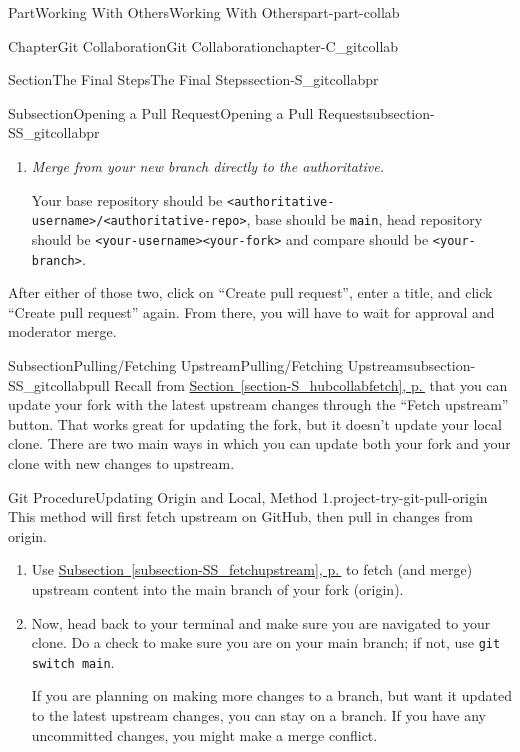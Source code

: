 \documentclass[twoside,10pt,]{book}
\newcommand{\xreffont}{\relax}
\newcommand{\mono}[1]{\texttt{#1}}
\newcommand{\lititle}[1]{{\slshape#1}}
\begin{document}
\begin{partptx}{Part}{Working With Others}{}{Working With Others}{}{}{part-part-collab}
\begin{chapterptx}{Chapter}{Git Collaboration}{}{Git Collaboration}{}{}{chapter-C_gitcollab}
\begin{sectionptx}{Section}{The Final Steps}{}{The Final Steps}{}{}{section-S_gitcollabpr}
\begin{subsectionptx}{Subsection}{Opening a Pull Request}{}{Opening a Pull Request}{}{}{subsection-SS_gitcollabpr}
\begin{enumerate}
\item{}\lititle{Merge from your new branch directly to the authoritative.}\par%
Your base repository should be \mono{<authoritative-username>/<authoritative-repo>}, base should be \mono{main}, head repository should be \mono{<your-username><your-fork>} and compare should be \mono{<your-branch>}.%
\end{enumerate}
%
\par
After either of those two, click on ``Create pull request'', enter a title, and click ``Create pull request'' again. From there, you will have to wait for approval and moderator merge.%
\end{subsectionptx}
%
%
\typeout{************************************************}
\typeout{************************************************}
%
\begin{subsectionptx}{Subsection}{Pulling\slash{}Fetching Upstream}{}{Pulling\slash{}Fetching Upstream}{}{}{subsection-SS_gitcollabpull}
%
%
%
%
%
Recall from \hyperref[section-S_hubcollabfetch]{Section~{\xreffont\ref{section-S_hubcollabfetch}}, p.\,\pageref{section-S_hubcollabfetch}} that you can update your fork with the latest upstream changes through the ``Fetch upstream'' button. That works great for updating the fork, but it doesn't update your local clone. There are two main ways in which you can update both your fork and your clone with new changes to upstream.%
\begin{project}{Git Procedure}{Updating Origin and Local, Method 1.}{project-try-git-pull-origin}%
%
%
%
%
This method will first fetch upstream on GitHub, then pull in changes from origin.%
\begin{enumerate}[font=\bfseries,label=(\alph*),ref=\alph*]%
\item{}Use \hyperref[subsection-SS_fetchupstream]{Subsection~{\xreffont\ref{subsection-SS_fetchupstream}}, p.\,\pageref{subsection-SS_fetchupstream}} to fetch (and merge) upstream content into the main branch of your fork (origin).%
\item{}Now, head back to your terminal and make sure you are navigated to your clone. Do a check to make sure you are on your main branch; if not, use \mono{git switch main}.%
\par
If you are planning on making more changes to a branch, but want it updated to the latest upstream changes, you can stay on a branch. If you have any uncommitted changes, you might make a merge conflict.%

\end{enumerate}
\end{project}
\end{subsectionptx}
\end{sectionptx}
\end{chapterptx}
\end{partptx}
\end{document}
